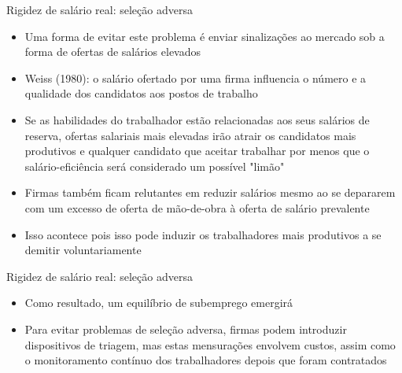 \documentclass[10pt]{beamer}
\begin{document}
\begin{frame}{Rigidez de salário real: seleção adversa}
    \begin{itemize}
        \item Uma forma de evitar este problema é enviar sinalizações ao mercado sob a forma de ofertas de salários elevados\bigskip
        \item Weiss (1980): o salário ofertado por uma firma influencia o número e a qualidade dos candidatos aos postos de trabalho\bigskip
        \item Se as habilidades do trabalhador estão relacionadas aos seus salários de reserva, ofertas salariais mais elevadas irão atrair os candidatos mais produtivos e qualquer candidato que aceitar trabalhar por menos que o salário-eficiência será considerado um possível "limão"\bigskip
        \item Firmas também ficam relutantes em reduzir salários mesmo ao se depararem com um excesso de oferta de mão-de-obra à oferta de salário prevalente\bigskip
        \item Isso acontece pois isso pode induzir os trabalhadores mais produtivos a se demitir voluntariamente
    \end{itemize}
\end{frame}

\begin{frame}{Rigidez de salário real: seleção adversa}
    \begin{itemize}
        \item Como resultado, um equilíbrio de subemprego emergirá\bigskip
        \item Para evitar problemas de seleção adversa, firmas podem introduzir dispositivos de triagem, mas estas mensurações envolvem custos, assim como o monitoramento contínuo dos trabalhadores depois que foram contratados
    \end{itemize}
\end{frame}
\end{document}

